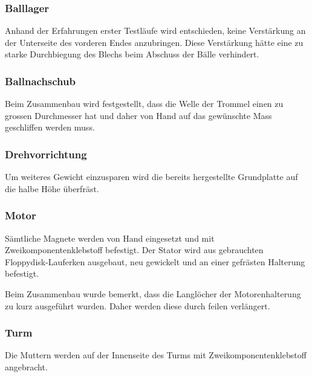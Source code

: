 \subsubsection{Balllager}
Anhand der Erfahrungen erster Testläufe wird entschieden, keine Verstärkung an der Unterseite des vorderen Endes anzubringen. Diese Verstärkung hätte eine zu starke Durchbiegung des Blechs beim Abschuss der Bälle verhindert.
\subsubsection{Ballnachschub}
Beim Zusammenbau wird festgestellt, dass die Welle der Trommel einen zu grossen Durchmesser hat und daher von Hand auf das gewünschte Mass geschliffen werden muss.
\subsubsection{Drehvorrichtung}
Um weiteres Gewicht einzusparen wird die bereits hergestellte Grundplatte auf die halbe Höhe überfräst.
\subsubsection{Motor}
Sämtliche Magnete werden von Hand eingesetzt und mit Zweikomponentenklebstoff befestigt. Der Stator wird aus gebrauchten Floppydisk-Lauferken ausgebaut, neu gewickelt und an einer gefrästen Halterung befestigt.

Beim Zusammenbau wurde bemerkt, dass die Langlöcher der Motorenhalterung zu kurz ausgeführt wurden. Daher werden diese durch feilen verlängert.
\subsubsection{Turm}
Die Muttern werden auf der Innenseite des Turms mit Zweikomponentenklebstoff angebracht.